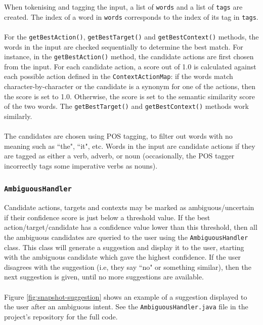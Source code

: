 \documentclass[11pt]{article}
\begin{document}
When tokenising and tagging the input, a list of \texttt{words} and a list of \texttt{tags} are created. The index of a word in \texttt{words} corresponds to the index of its tag in \texttt{tags}.
\\
\\
For the \texttt{getBestAction()}, \texttt{getBestTarget()} and  \texttt{getBestContext()} methods, the words in the input are checked sequentially to determine the best match. For instance, in the \texttt{getBestAction()} method, the candidate actions are first chosen from the input. For each candidate action, a score out of 1.0 is calculated against each possible action defined in the \texttt{ContextActionMap}: if the words match character-by-character or the candidate is a synonym for one of the actions, then the score is set to 1.0. Otherwise, the score is set to the semantic similarity score of the two words. The \texttt{getBestTarget()} and \texttt{getBestContext()} methods work similarly.
\\
\\
The candidates are chosen using POS tagging, to filter out words with no meaning such as ``the", ``it", etc. Words in the input are candidate actions if they are tagged as either a verb, adverb, or noun (occasionally, the POS tagger incorrectly tags some imperative verbs as nouns).

\subsubsection{\texttt{AmbiguousHandler}}

Candidate actions, targets and contexts may be marked as ambiguous/uncertain if their confidence score is just below a threshold value. If the best action/target/candidate has a confidence value lower than this threshold, then all the ambiguous candidates are queried to the user using the \texttt{AmbiguousHandler} class. This class will generate a suggestion and display it to the user, starting with the ambiguous candidate which gave the highest confidence. If the user disagrees with the suggestion (i.e, they say ``no" or something similar), then the next suggestion is given, until no more suggestions are available.
\\
\\
Figure \ref{fig:snapshot-suggestion} shows an example of a suggestion displayed to the user after an ambiguous intent. See the \texttt{AmbiguousHandler.java} file in the project's repository for the full code.
\end{document}
